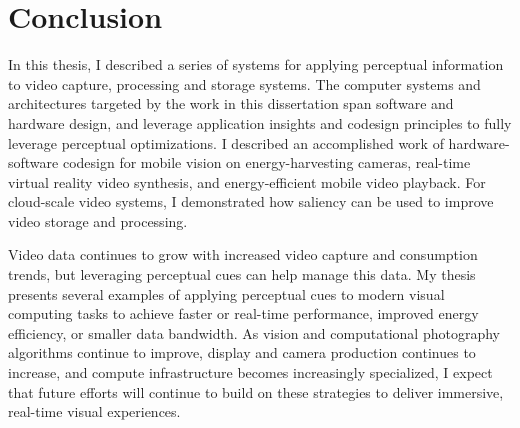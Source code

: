 \chapter{Conclusion}
\label{ch:concl}

In this thesis, I described a series of systems for applying perceptual information to video capture, processing and storage systems.
The computer systems and architectures targeted by the work in this dissertation span software and hardware design, and leverage application insights and codesign principles to fully leverage perceptual optimizations.
I described an accomplished work of hardware-software codesign for mobile vision on energy-harvesting cameras, real-time virtual reality video synthesis, and energy-efficient mobile video playback.
For cloud-scale video systems, I demonstrated how saliency can be used to improve video storage and processing.

Video data continues to grow with increased video capture and consumption trends, but leveraging perceptual cues can help manage this data.
My thesis presents several examples of applying perceptual cues to modern visual computing tasks to achieve faster or real-time performance, improved energy efficiency, or smaller data bandwidth.
As vision and computational photography algorithms continue to improve, display and camera production continues to increase, and compute infrastructure becomes increasingly specialized, I expect that future efforts will continue to build on these strategies to deliver immersive, real-time visual experiences.

